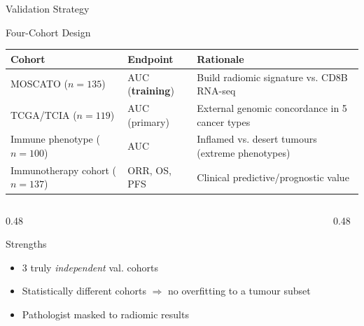 \documentclass[aspectratio=1610]{beamer}
\begin{document}

\begin{frame}{Validation Strategy}
    \vspace{-0.3cm}
    \begin{block}{Four-Cohort Design}
        \footnotesize
        \begin{tabular}{lll}%
            \toprule
            \textbf{Cohort} & \textbf{Endpoint} & \textbf{Rationale} \\
            \midrule
            MOSCATO ($n=135$) & AUC (\textbf{training}) & Build radiomic signature vs. CD8B RNA-seq \\
            TCGA/TCIA ($n=119$) & AUC (primary) & External genomic concordance in 5 cancer types \\
            Immune phenotype ($n=100$) & AUC & Inflamed vs. desert tumours (extreme phenotypes) \\
            Immunotherapy cohort ($n=137$) & ORR, OS, PFS & Clinical predictive/prognostic value \\
        \end{tabular}
    \end{block} 
    \vspace{-0.3cm}
    \begin{columns}[T]
        \begin{column}{0.48\textwidth}
            \small
            \begin{exampleblock}{Strengths}
                \begin{itemize}
                    \item 3 truly \textit{independent} val. cohorts
                    \item Statistically different cohorts $\Rightarrow$ no overfitting to a tumour subset
                    \item Pathologist masked to radiomic results
                \end{itemize}
            \end{exampleblock}
        \end{column}
        \begin{column}{0.48\textwidth}

\end{column}
\end{columns}
\end{frame}
\end{document}
